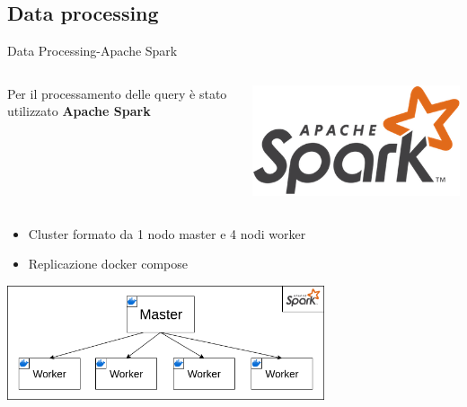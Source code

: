 \documentclass[13pt,aspectratio=169,t,xcolor=table]{beamer}
\begin{document}
\subsection{Data processing}
\begin{frame}{Data Processing-Apache Spark}
    \begin{columns}
            Per il processamento delle query è stato utilizzato \textbf{Apache Spark}
            \begin{minipage}{0.5\textwidth}
                \raggedleft
                \includegraphics[width=.9\textwidth]{res/spark_icon.png}
            \end{minipage}
    \end{columns}
    \vspace{0.5cm}
    \begin{itemize}
        \item Cluster formato da 1 nodo master e 4 nodi worker
        \item Replicazione docker compose
    \end{itemize}
    \begin{adjustbox}{margin=0.5cm, center}
        \includegraphics[width=0.7\textwidth]{res/spark_cluster.png}
    \end{adjustbox}
\end{frame}
\end{document}
